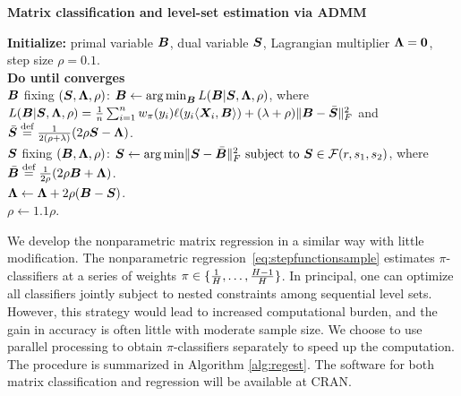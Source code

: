 \documentclass[11pt]{article}
\theoremstyle{plain}
\theoremstyle{definition}
\begin{document}
 \begin{algorithm}[ht]
  \caption{{\bf Matrix classification and level-set estimation via ADMM} } \label{alg:weighted}
{\bf Initialize:} primal variable $\bm B$, dual variable $\bm S$, Lagrangian multiplier $\bm{\Lambda}=\mathbf{0}$, step size $\rho=0.1$.\\[.1cm]
{\bf Do until converges}\\[.1cm]
\hspace*{.2cm}{\bf Update} $\bm B$ fixing $(\bm S,\bm{\Lambda},\rho)$: 
$\bm B \leftarrow \operatorname*{arg\,min}_{\bm B} L(\bm B|\bm S,\bm{\Lambda},\rho)$, where $L(\bm B|\bm S,\bm{\Lambda},\rho)={1\over n}\sum_{i=1}^n w_\pi(y_i)\ell(y_i\langle\bm X_i,\bm B\rangle)+(\lambda+\rho)\lVert\bm B-\bar {\bm S}\rVert_F^2$ and $\bar {\bm S}\stackrel{\text{def}}{=}{1\over 2(\rho+\lambda)}(2\rho\bm S-\bm{\Lambda})$. \\[.1cm]
\hspace*{.2cm}{\bf Update} $\bm S$ fixing $(\bm B,\bm{\Lambda},\rho)$: $\bm S \leftarrow  \operatorname*{arg\,min} \lVert\bm S-\bar {\bm B}\rVert_F^2 \ \text{subject to }\bm S\in\mathcal{F}(r,s_1,s_2)$, where $\bar {\bm B}\stackrel{\text{def}}{=}{1\over 2\rho}(2\rho\bm B+\bm{\Lambda})$. \\[.1cm]
\hspace*{.2cm}{\bf Update} $\bm{\Lambda} \leftarrow \bm{\Lambda}+2\rho(\bm B-\bm S)$.\\[.1cm]
 \hspace*{.2cm}{\bf Update} $\rho\leftarrow1.1\rho$.\\[.1cm]
\end{algorithm}

We develop the nonparametric matrix regression in a similar way with little modification. The nonparametric regression~\eqref{eq:stepfunctionsample} estimates $\pi$-classifiers at a series of weights $\pi \in \{{1\over H},\ldots, {H-1\over H}\}$. In principal, one can optimize all classifiers jointly subject to nested constraints among sequential level sets. However, this strategy would lead to increased computational burden, and the gain in accuracy is often little with moderate sample size. We choose to use parallel processing to obtain $\pi$-classifiers separately to speed up the computation. The procedure is summarized in Algorithm \ref{alg:regest}. The software for both matrix classification and regression will be available at CRAN.
\end{document}
